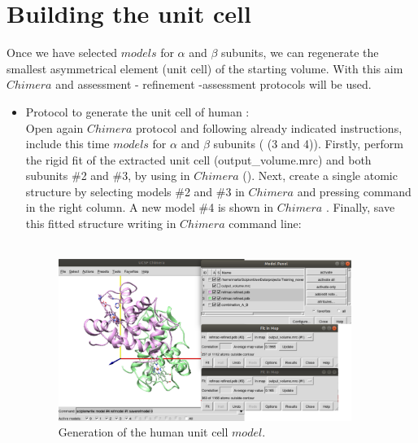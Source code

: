 
\section{Building the unit cell}

Once we have selected $models$ for  $\alpha$ and $\beta$ subunits, we can regenerate the smallest asymmetrical element (unit cell) of the starting volume. With this aim $Chimera$  and assessment - refinement -assessment protocols will be used.\\ 

\begin{itemize}
 \item Protocol  to generate the unit cell of human :\\
 
    Open again $Chimera$  protocol and following already indicated instructions, include this time $models$ for  $\alpha$ and $\beta$ subunits ( (3 and 4)). Firstly, perform the rigid fit of the extracted unit cell (output\_volume.mrc) and both subunits \#2 and \#3, by using  in $Chimera$ (). Next, create a single atomic structure by selecting models \#2 and \#3 in $Chimera$  and pressing  command in the right column. A new model \#4 is shown in $Chimera$ . Finally, save this fitted structure writing in $Chimera$ command line:\\
    \\
    
    \begin{figure}[H]
    \centering 
    \captionsetup{width=.7\linewidth} 
    \includegraphics[width=0.90\textwidth]{Images/Fig40.png}
    \caption{Generation of the human  unit cell $model$.}
    \label{fig:chimera_rigid_fit_A_B}
   \end{figure}
    

\end{itemize}

